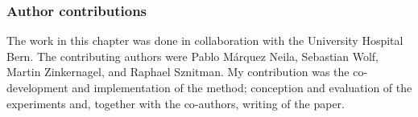 \subsubsection{Author contributions}The work in this chapter was done in collaboration with the University Hospital Bern. The contributing authors were Pablo Márquez Neila, Sebastian Wolf, Martin Zinkernagel, and Raphael Sznitman. My contribution was the co-development and implementation of the method; conception and evaluation of the experiments and, together with the co-authors, writing of the paper.






